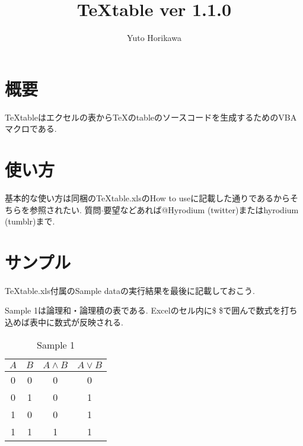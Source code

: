 \documentclass{jsarticle}
\title{TeXtable ver 1.1.0}
\author{Yuto Horikawa}
\begin{document}
\maketitle
\vspace{-3zw}
\section{概要}
TeXtableはエクセルの表からTeXのtableのソースコードを生成するためのVBAマクロである.
\section{使い方}
基本的な使い方は同梱のTeXtable.xlsのHow to useに記載した通りであるからそちらを参照されたい.
質問$\cdot$要望などあれば@Hyrodium (twitter)またはhyrodium (tumblr)まで.
\section{サンプル}
TeXtable.xls付属のSample dataの実行結果を最後に記載しておこう.

Sample 1は論理和・論理積の表である.
Excelのセル内に\$ \$で囲んで数式を打ち込めば表中に数式が反映される.
\vspace{-0.5em}
\begin{table}[htb]
	\captionsetup{labelformat=empty,labelsep=none}
	\caption{Sample 1}
	\label{sample1}
	\centering
	\begin{tabular}{|c|c|c|c|}\hline
		$A$	&$B$	&$A\land B$	&$A\lor B$	\\ \hline
		0	&0	&0	&0	\\ \hline
		0	&1	&0	&1	\\ \hline
		1	&0	&0	&1	\\ \hline
		1	&1	&1	&1	\\ \hline
	\end{tabular}
\end{table}
\end{document}
